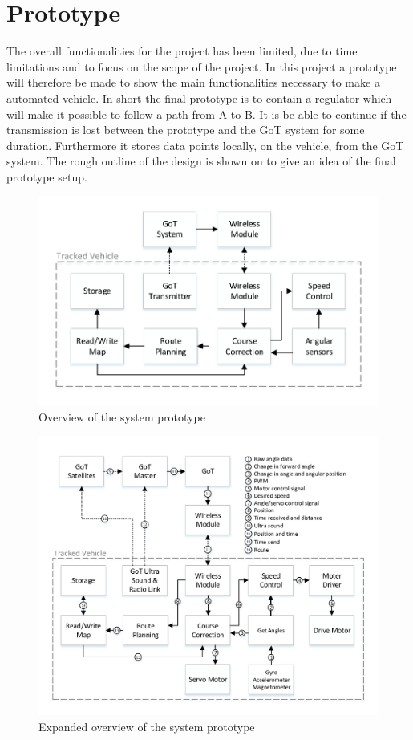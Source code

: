 \section{Prototype}
The overall functionalities for the project has been limited, due to time limitations and to focus on the scope of the project. In this project a prototype will therefore be made to show the main functionalities necessary to make a automated vehicle.
In short the final prototype is to contain a regulator which will make it possible to follow a path from A to B. It is be able to continue if the transmission is lost between the prototype and the GoT system for some duration. Furthermore it stores data points locally, on the vehicle, from the GoT system. The rough outline of the design is shown on  to give an idea of the final prototype setup.

\begin{figure}[H]
	\centering
	\includegraphics[scale=.9]{figures/systemOverview1}
	\caption{Overview of the system prototype}
	\label{fig:systemOverview1}
\end{figure}


\begin{figure}[H]
	\centering
	\includegraphics[scale=.9]{figures/systemOverview2}
	\caption{Expanded overview of the system prototype}
	\label{fig:systemOverview2}
\end{figure}